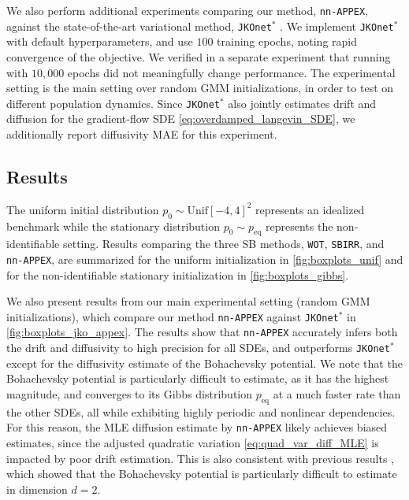 \documentclass[twoside]{article}
\newcommand{\jkonetstar}{\texttt{JKOnet}$^\ast$}
\newcommand{\nappex}{\texttt{nn-APPEX}}
\newcommand{\wot}{\texttt{WOT}}
\newcommand{\sbirr}{\texttt{SBIRR}}
\begin{document}
We also perform additional experiments comparing our method, \nappex, against the state-of-the-art variational method, \jkonetstar{} \citep{terpin2024learning}. We implement \jkonetstar{} with default hyperparameters, and use $100$ training epochs, noting rapid convergence of the objective. We verified in a separate experiment that running with $10,000$ epochs did not meaningfully change performance. The experimental setting is the main setting over random GMM initializations, in order to test on different population dynamics. Since \jkonetstar{} also jointly estimates drift and diffusion for the gradient-flow SDE \eqref{eq:overdamped_langevin_SDE}, we additionally report diffusivity MAE for this experiment.

\subsection{Results}
The uniform initial distribution $p_0\sim \mathrm{Unif}[-4,4]^2$ represents an idealized benchmark \citep{terpin2024learning} while the stationary distribution $p_0 \sim p_{\mathrm{eq}}$ represents the non-identifiable setting. Results comparing the three SB methods, \wot, \sbirr, and \nappex, are summarized for the uniform initialization in \cref{fig:boxplots_unif} and for the non-identifiable stationary initialization in \cref{fig:boxplots_gibbs}. 

We also present results from our main experimental setting (random GMM initializations), which compare our method \nappex{} against \jkonetstar{} in \cref{fig:boxplots_jko_appex}. The results show that \nappex{} accurately infers both the drift and diffusivity to high precision for all SDEs, and outperforms \jkonetstar except for the diffusivity estimate of the Bohachevsky potential. We note that the Bohachevsky potential is particularly difficult to estimate, as it has the highest magnitude, and converges to its Gibbs distribution $p_{\mathrm{eq}}$ at a much faster rate than the other SDEs, all while exhibiting highly periodic and nonlinear dependencies. For this reason, the MLE diffusion estimate by \nappex{} likely achieves biased estimates, since the adjusted quadratic variation \eqref{eq:quad_var_diff_MLE} is impacted by poor drift estimation. This is also consistent with previous results \citep{terpin2024learning}, which showed that the Bohachevsky potential is particularly difficult to estimate in dimension $d=2$.
\end{document}

